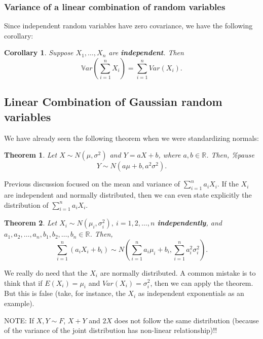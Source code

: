 \documentclass[
]{book}
\newtheorem{theorem}{Theorem}[chapter]
\newtheorem{corollary}{Corollary}[chapter]
\theoremstyle{definition}
\theoremstyle{definition}
\theoremstyle{definition}
\theoremstyle{definition}
\theoremstyle{remark}
\begin{document}
\subsubsection{Variance of a linear combination of random variables}\label{variance-of-a-linear-combination-of-random-variables}

Since independent random variables have zero covariance, we have the following corollary:

\begin{corollary}
Suppose \(X_1,\dots,X_n\) are \textbf{independent}. Then
\[\mathbb{V}ar\left(\sum_{i=1}^n X_i\right)=\sum_{i=1}^n Var(X_i).\]
\end{corollary}

\subsection{Linear Combination of Gaussian random variables}\label{linear-combination-of-gaussian-random-variables}

We have already seen the following theorem when we were standardizing normals:

\begin{theorem}
Let \(X \sim N(\mu, \sigma^2)\) and \(Y = aX + b\), where \(a,b \in \mathbb{R}\). Then,
\%pause
\[
Y \sim N(a\mu + b, a^2 \sigma^2).
\]
\end{theorem}

Previous discussion focused on the mean and variance of \(\sum_{i=1}^n a_iX_i\). If the \(X_i\) are independent and normally distributed, then we can even state explicitly the distribution of \(\sum_{i=1}^n a_iX_i\).

\begin{theorem}
Let \(X_i \sim N(\mu_i, \sigma_i^2), \ i = 1, 2, \ldots, n\) \textbf{independently}, and \(a_1, a_2, \ldots, a_n, b_1, b_2, \ldots, b_n \in \mathbb{R}\). Then,
\[
\sum_{i=1}^n (a_i X_i + b_i) \sim N \left( \sum_{i=1}^n a_i \mu_i + b_i, \sum_{i=1}^n a_i^2 \sigma_i^2 \right).
\]
\end{theorem}

We really do need that the \(X_i\) are normally distributed. A common mistake is to think that if \(E(X_i)=\mu_i\) and \(Var(X_i)=\sigma_i^2\), then we can apply the theorem. But this is false (take, for instance, the \(X_i\) as independent exponentials as an example).

NOTE: If \(X,Y\sim F\), \(X+Y\) and \(2X\) does not follow the same distribution (because of the variance of the joint distribution has non-linear relationship)!!
\end{document}
